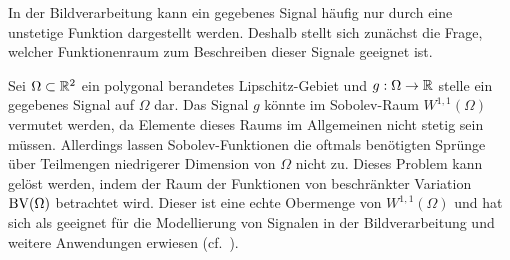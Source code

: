 In der Bildverarbeitung kann ein gegebenes Signal häufig nur durch eine
unstetige Funktion dargestellt werden. Deshalb stellt sich zunächst die Frage,
welcher Funktionenraum zum Beschreiben dieser Signale geeignet ist.

Sei $\Omega\subset\mathbb{R}^2$ ein polygonal berandetes Lipschitz-Gebiet und
$g:\Omega\to \mathbb{R}$ stelle ein gegebenes Signal auf $\Omega$ dar. 
Das Signal $g$ könnte im Sobolev-Raum $W^{1,1}(\Omega)$ vermutet werden, da
Elemente dieses Raums im Allgemeinen nicht stetig sein müssen. 
Allerdings lassen Sobolev-Funktionen die oftmals benötigten Sprünge über
Teilmengen niedrigerer Dimension von $\Omega$ nicht zu.
Dieses Problem kann gelöst werden, indem der Raum der Funktionen von
beschränkter Variation $\textup{BV}(\Omega)$ betrachtet wird. 
Dieser ist eine echte Obermenge von $W^{1,1}(\Omega)$ und hat sich als geeignet
für die Modellierung von Signalen in der Bildverarbeitung und weitere
Anwendungen erwiesen (cf.\ \cites[393]{ABM14}[42]{AK06}[297]{Bar15}[S. 1
f.]{Bra98}).

